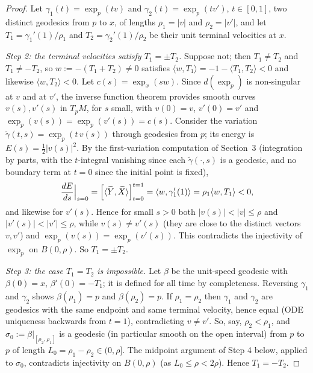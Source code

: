 \begin{proof}
Let $\gamma_1(t)=\exp_p(tv)$ and $\gamma_2(t)=\exp_p(tv')$,
$t\in[0,1]$, two distinct geodesics from $p$ to $x$, of lengths
$\rho_1=|v|$ and $\rho_2=|v'|$, and let $T_1=\gamma_1'(1)/\rho_1$
and $T_2=\gamma_2'(1)/\rho_2$ be their unit terminal velocities at
$x$.

\emph{Step 2: the terminal velocities satisfy $T_1=\pm T_2$.}
Suppose not; then $T_1\not=T_2$ and $T_1\not=-T_2$, so
$w:=-(T_1+T_2)\not=0$ satisfies $\langle w,T_1\rangle
=-1-\langle T_1,T_2\rangle<0$ and likewise $\langle
w,T_2\rangle<0$. Let $c(s)=\exp_x(sw)$. Since
$d(\exp_p)$ is non-singular at $v$ and at $v'$, the inverse
function theorem provides smooth curves $v(s),v'(s)$ in $T_pM$, for
$s$ small, with $v(0)=v$, $v'(0)=v'$ and
$\exp_p(v(s))=\exp_p(v'(s))=c(s)$. Consider the variation
$\tilde\gamma(t,s)=\exp_p(t\,v(s))$ through geodesics from $p$;
its energy is $E(s)=\frac12|v(s)|^2$. By the first-variation
computation of Section~3 (integration by parts, with the
$t$-integral vanishing since each $\tilde\gamma(\cdot,s)$ is a
geodesic, and no boundary term at $t=0$ since the initial point is
fixed),
$$\frac{dE}{ds}\Bigl|_{s=0}\Bigr.
=\Bigl[\langle \widetilde Y,\widetilde
X\rangle\Bigr]_{t=0}^{t=1}
=\langle w,\gamma_1'(1)\rangle=\rho_1\langle w,T_1\rangle<0,$$
and likewise for $v'(s)$. Hence for small $s>0$ both $|v(s)|<
|v|\le\rho$ and $|v'(s)|<|v'|\le\rho$, while
$v(s)\not=v'(s)$ (they are close to the distinct vectors $v,v'$)
and $\exp_p(v(s))=\exp_p(v'(s))$. This contradicts the
injectivity of $\exp_p$ on $B(0,\rho)$. So $T_1=\pm T_2$.

\emph{Step 3: the case $T_1=T_2$ is impossible.} Let $\beta$ be the
unit-speed geodesic with $\beta(0)=x$, $\beta'(0)=-T_1$; it is
defined for all time by completeness. Reversing $\gamma_1$ and
$\gamma_2$ shows $\beta(\rho_1)=p$ and $\beta(\rho_2)=p$. If
$\rho_1=\rho_2$ then $\gamma_1$ and $\gamma_2$ are geodesics with
the same endpoint and same terminal velocity, hence equal (ODE
uniqueness backwards from $t=1$), contradicting $v\not=v'$. So,
say, $\rho_2<\rho_1$, and $\sigma_0:=\beta|_{[\rho_2,\rho_1]}$ is a
geodesic (in particular smooth on the open interval) from $p$ to
$p$ of length $L_0=\rho_1-\rho_2\in(0,\rho]$. The midpoint
argument of Step 4 below, applied to $\sigma_0$, contradicts
injectivity on $B(0,\rho)$ (as $L_0\le \rho<2\rho$). Hence
$T_1=-T_2$.


\end{proof}
